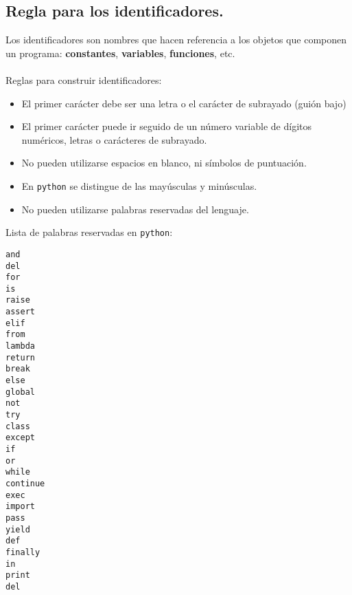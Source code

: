 \documentclass[11pt]{article}
\begin{document}
\subsection{Regla para los identificadores.}\label{regla-para-los-identificadores}
Los identificadores son nombres que hacen referencia a los objetos que componen un programa: \textbf{constantes}, \textbf{variables}, \textbf{funciones}, etc.
\\
\\
Reglas para construir identificadores:
\begin{itemize}
\item El primer carácter debe ser una letra o el carácter de subrayado (guión bajo)
\item El primer carácter puede ir seguido de un número variable de dígitos numéricos, letras o carácteres de subrayado.
\item No pueden utilizarse espacios en blanco, ni símbolos de puntuación.
\item En \texttt{python} se distingue de las mayúsculas y minúsculas.
\item No pueden utilizarse palabras reservadas del lenguaje.
\end{itemize}
Lista de palabras reservadas en \texttt{python}:
\begin{multicols}{6}
\texttt{and \\
del \\
for \\
is \\
raise \\
assert \\
elif \\
from \\
lambda \\
return \\
break \\
else \\
global \\
not \\
try \\
class \\
except \\
if \\
or \\ 
while \\
continue \\
exec \\
import \\
pass \\
yield \\
def \\
finally \\
in \\
print \\
del 
}
\end{multicols}
\end{document}
